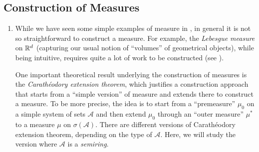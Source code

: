 \subsection{Construction of Measures}
\label{subsect:construct-measures}
\begin{enumerate}
\item While we have seen some simple examples of measure in
, in general it is not so straightforward to
construct a measure. For example, the \emph{Lebesgue measure} on \(\mathbb{R}^d\)
(capturing our usual notion of ``volumes'' of geometrical objects), while being
intuitive, requires quite a lot of work to be constructed (see
).

One important theoretical result underlying the construction of measures is the
\emph{Carath\'eodory extension theorem}, which justifies a construction
approach that starts from a ``simple version'' of measure and extends
there to construct a measure. To be more precise, the idea is to start from a
``premeasure'' \(\mu_0\) on a simple system of sets \(\mathcal{A}\) and then
extend \(\mu_0\) through an ``outer measure'' \(\mu^*\) to a measure \(\mu\) on
\(\sigma(\mathcal{A})\). There are different versions of Carath\'eodory
extension theorem, depending on the type of \(\mathcal{A}\). Here, we will
study the version where \(\mathcal{A}\) is a \emph{semiring}.


\end{enumerate}
